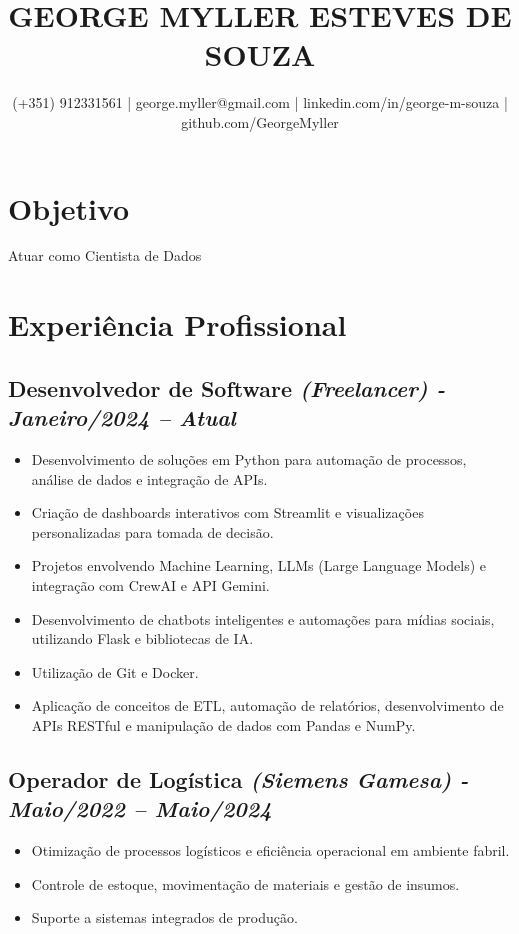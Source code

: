 \documentclass{article}
\title{GEORGE MYLLER ESTEVES DE SOUZA}
\author{(+351) 912331561 | george.myller@gmail.com | linkedin.com/in/george-m-souza | github.com/GeorgeMyller}
\begin{document}
\maketitle

\section*{Objetivo}
\noindent Atuar como Cientista de Dados

\section*{Experiência Profissional}

\subsection*{Desenvolvedor de Software \textit{(Freelancer) - Janeiro/2024 -- Atual}}
\begin{itemize}
    \item Desenvolvimento de soluções em Python para automação de processos, análise de dados e integração de APIs.
    \item Criação de dashboards interativos com Streamlit e visualizações personalizadas para tomada de decisão.
    \item Projetos envolvendo Machine Learning, LLMs (Large Language Models) e integração com CrewAI e API Gemini.
    \item Desenvolvimento de chatbots inteligentes e automações para mídias sociais, utilizando Flask e bibliotecas de IA.
    \item Utilização de Git e Docker.
    \item Aplicação de conceitos de ETL, automação de relatórios, desenvolvimento de APIs RESTful e manipulação de dados com Pandas e NumPy.
\end{itemize}

\subsection*{Operador de Logística \textit{(Siemens Gamesa) - Maio/2022 -- Maio/2024}}
\begin{itemize}
    \item Otimização de processos logísticos e eficiência operacional em ambiente fabril.
    \item Controle de estoque, movimentação de materiais e gestão de insumos.
    \item Suporte a sistemas integrados de produção.
\end{itemize}
\end{document}
